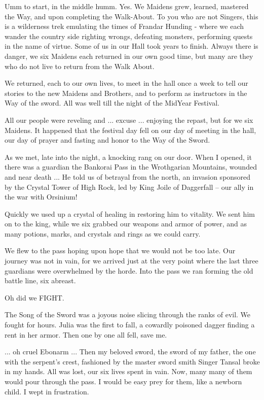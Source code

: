 Umm to start, in the middle humm. Yes. We Maidens grew, learned, mastered the Way, and upon completing the Walk-About. To you who are not Singers, this is a wilderness trek emulating the times of Frandar Hunding - where we each wander the country side righting wrongs, defeating monsters, performing quests in the name of virtue. Some of us in our Hall took years to finish. Always there is danger, we six Maidens each returned in our own good time, but many are they who do not live to return from the Walk About.

We returned, each to our own lives, to meet in the hall once a week to tell our stories to the new Maidens and Brothers, and to perform as instructors in the Way of the sword. All was well till the night of the MidYear Festival.

All our people were reveling and ... excuse ... enjoying the repast, but for we six Maidens. It happened that the festival day fell on our day of meeting in the hall, our day of prayer and fasting and honor to the Way of the Sword.

As we met, late into the night, a knocking rang on our door. When I opened, it there was a guardian the Bankorai Pass in the Wrothgarian Mountains, wounded and near death ... He told us of betrayal from the north, an invasion sponsored by the Crystal Tower of High Rock, led by King Joile of Daggerfall -- our ally in the war with Orsinium!

Quickly we used up a crystal of healing in restoring him to vitality. We sent him on to the king, while we six grabbed our weapons and armor of power, and as many potions, marks, and crystals and rings as we could carry.

We flew to the pass hoping upon hope that we would not be too late. Our journey was not in vain, for we arrived just at the very point where the last three guardians were overwhelmed by the horde. Into the pass we ran forming the old battle line, six abreast.

Oh did we FIGHT.

The Song of the Sword was a joyous noise slicing through the ranks of evil. We fought for hours. Julia was the first to fall, a cowardly poisoned dagger finding a rent in her armor. Then one by one all fell, save me.

... oh cruel Ebonarm ... Then my beloved sword, the sword of my father, the one with the serpent's crest, fashioned by the master sword smith Singer Tansal broke in my hands. All was lost, our six lives spent in vain. Now, many many of them would pour through the pass. I would be easy prey for them, like a newborn child. I wept in frustration.

